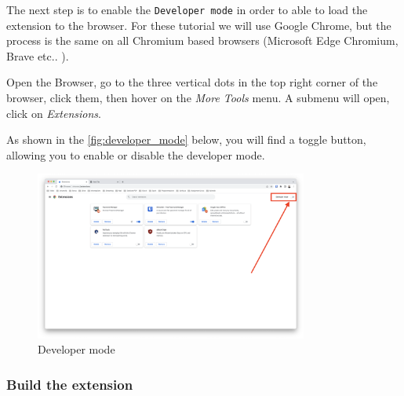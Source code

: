 The next step is to enable the \texttt{Developer mode} in order to able to load the extension to the browser. For these tutorial we will use Google Chrome, but the process is the same on all Chromium based browsers (Microsoft Edge Chromium, Brave etc.. ).

Open the Browser, go to the three vertical dots in the top right corner of the browser, click them, then hover on the \textit{More Tools} menu. A submenu will open, click on \textit{Extensions}.

As shown in the \autoref{fig:developer_mode} below, you will find a toggle button, allowing you to enable or disable the developer mode.

\begin{figure}[htb]
	\centering
	\includegraphics[width=0.8\textwidth]{images/extension/developer-mode.png}
	\caption{Developer mode}
	\label{fig:developer_mode}
\end{figure}

\subsubsection{Build the extension}

